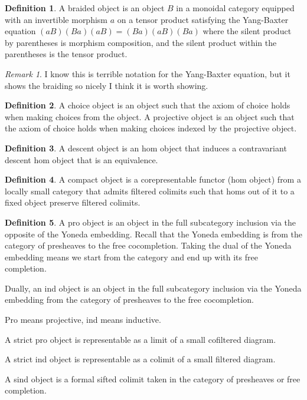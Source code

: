 \documentclass[10pt]{article}
\theoremstyle{plain}%
\theoremstyle{definition}
\newtheorem{definition}{Definition}[section]
\theoremstyle{remark}
\newtheorem*{remark}{Remark}
\begin{document}
\begin{definition}
    A braided object is an object $B$ in a monoidal category equipped with an invertible morphism $a$ on a tensor product satisfying the Yang-Baxter equation $(a B)(B a)(a B) = (B a)(a B)(B a)$ where the silent product by parentheses is morphism composition, and the silent product within the parentheses is the tensor product.
\end{definition}

\begin{remark}
    I know this is terrible notation for the Yang-Baxter equation, but it shows the braiding so nicely I think it is worth showing.
\end{remark}

\begin{definition}
    A choice object is an object such that the axiom of choice holds when making choices from the object. A projective object is an object such that the axiom of choice holds when making choices indexed by the projective object.
\end{definition}

\begin{definition}
    A descent object is an hom object that induces a contravariant descent hom object that is an equivalence.
\end{definition}

\begin{definition}
    A compact object is a corepresentable functor (hom object) from a locally small category that admits filtered colimits such that homs out of it to a fixed object preserve filtered colimits.
\end{definition}

\begin{definition}
    A pro object is an object in the full subcategory inclusion via the opposite of the Yoneda embedding. Recall that the Yoneda embedding is from the category of presheaves to the free cocompletion. Taking the dual of the Yoneda embedding means we start from the category and end up with its free completion.

    Dually, an ind object is an object in the full subcategory inclusion via the Yoneda embedding from the category of presheaves to the free cocompletion.

    Pro means projective, ind means inductive.

    A strict pro object is representable as a limit of a small cofiltered diagram.

    A strict ind object is representable as a colimit of a small filtered diagram.

    A sind object is a formal sifted colimit taken in the category of presheaves or free completion.
\end{definition}
\end{document}
